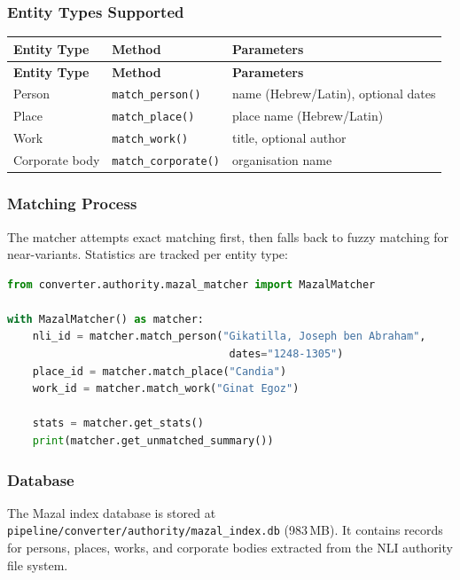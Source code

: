 \documentclass[12pt]{article}
\newcommand{\filepath}[1]{\texttt{\small #1}}
\newcommand{\code}[1]{\texttt{#1}}
\begin{document}
\subsubsection{Entity Types Supported}

\begin{longtable}{|l|l|p{6cm}|}
\hline
\textbf{Entity Type} & \textbf{Method} & \textbf{Parameters} \\
\hline
\endfirsthead
\hline
\textbf{Entity Type} & \textbf{Method} & \textbf{Parameters} \\
\hline
\endhead
\hline
\endfoot
Person & \code{match\_person()} & name (Hebrew/Latin), optional dates \\
\hline
Place & \code{match\_place()} & place name (Hebrew/Latin) \\
\hline
Work & \code{match\_work()} & title, optional author \\
\hline
Corporate body & \code{match\_corporate()} & organisation name \\
\hline
\end{longtable}

\subsubsection{Matching Process}

The matcher attempts exact matching first, then falls back to fuzzy matching for near-variants. Statistics are tracked per entity type:

\begin{lstlisting}[language=Python, caption={Authority matching usage}]
from converter.authority.mazal_matcher import MazalMatcher

with MazalMatcher() as matcher:
    nli_id = matcher.match_person("Gikatilla, Joseph ben Abraham", 
                                   dates="1248-1305")
    place_id = matcher.match_place("Candia")
    work_id = matcher.match_work("Ginat Egoz")
    
    stats = matcher.get_stats()
    print(matcher.get_unmatched_summary())
\end{lstlisting}

\subsubsection{Database}

The Mazal index database is stored at \filepath{pipeline/converter/authority/mazal\_index.db} (983\,MB). It contains records for persons, places, works, and corporate bodies extracted from the NLI authority file system.
\end{document}
